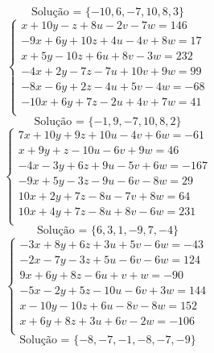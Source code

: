 \documentclass[12pt,oneside,a4paper]{article}
\begin{document}
\begin{equation*}
\text{Solução = }\{-10,6,-7,10,8,3\}
\end{equation*}
\vspace{\baselineskip}
\begin{equation*}
\begin{cases}
x+10y-z+8u-2v-7w=146 \\
-9x+6y+10z+4u-4v+8w=17 \\
x+5y-10z+6u+8v-3w=232 \\
-4x+2y-7z-7u+10v+9w=99 \\
-8x-6y+2z-4u+5v-4w=-68 \\
-10x+6y+7z-2u+4v+7w=41 \\
\end{cases}
\end{equation*}
\begin{equation*}
\text{Solução = }\{-1,9,-7,10,8,2\}
\end{equation*}
\vspace{\baselineskip}
\begin{equation*}
\begin{cases}
7x+10y+9z+10u-4v+6w=-61 \\
x+9y+z-10u-6v+9w=46 \\
-4x-3y+6z+9u-5v+6w=-167 \\
-9x+5y-3z-9u-6v-8w=29 \\
10x+2y+7z-8u-7v+8w=64 \\
10x+4y+7z-8u+8v-6w=231 \\
\end{cases}
\end{equation*}
\begin{equation*}
\text{Solução = }\{6,3,1,-9,7,-4\}
\end{equation*}
\vspace{\baselineskip}
\begin{equation*}
\begin{cases}
-3x+8y+6z+3u+5v-6w=-43 \\
-2x-7y-3z+5u-6v-6w=124 \\
9x+6y+8z-6u+v+w=-90 \\
-5x-2y+5z-10u-6v+3w=144 \\
x-10y-10z+6u-8v-8w=152 \\
x+6y+8z+3u+6v-2w=-106 \\
\end{cases}
\end{equation*}
\begin{equation*}
\text{Solução = }\{-8,-7,-1,-8,-7,-9\}
\end{equation*}
\end{document}

